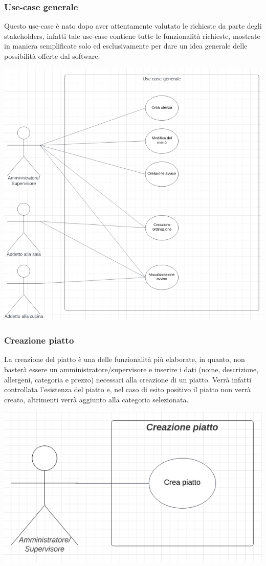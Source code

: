 \subsubsection{Use-case generale}
Questo use-case è nato dopo aver attentamente valutato le richieste da parte degli stakeholders, infatti tale use-case contiene tutte le funzionalità richieste, mostrate in maniera semplificate solo ed esclusivamente per dare un idea generale delle possibilità offerte dal software.
\begin{center}
  \includegraphics[scale=0.8]{img/use_case/use_case_generale.png}
\end{center}

\subsubsection{Creazione piatto}
La creazione del piatto è una delle funzionalità più elaborate, in quanto, non basterà essere un amministratore/supervisore e inserire i dati (nome, descrizione, allergeni, categoria e prezzo) necessari alla creazione di un piatto. Verrà infatti controllata l'esistenza del piatto e, nel caso di esito positivo il piatto non verrà creato, altrimenti verrà aggiunto alla categoria selezionata.
\begin{center}
  \includegraphics[scale=0.8]{img/use_case/use_case-creazione_piatto.png}
\end{center}
